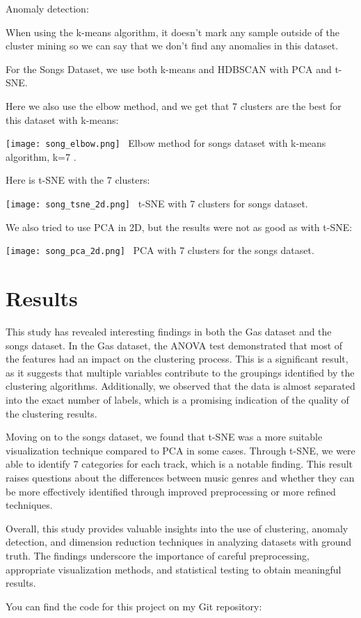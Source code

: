 Anomaly detection:

When using the k-means algorithm, it doesn't mark any sample outside of the cluster mining so we can say that we don't find any anomalies in this dataset.

For the Songs Dataset, we use both k-means and HDBSCAN with PCA and t-SNE.

Here we also use the elbow method, and we get that 7 clusters are the best for this dataset with k-means:

\begin{center}
\texttt{[image: song\_elbow.png]}\
\newline
Elbow method for songs dataset with k-means algorithm, k=7 .
\end{center}

Here is t-SNE with the 7 clusters:

\begin{center}
\texttt{[image: song\_tsne\_2d.png]}\
\newline
t-SNE with 7 clusters for songs dataset.
\end{center}

We also tried to use PCA in 2D, but the results were not as good as with t-SNE:

\begin{center}
\texttt{[image: song\_pca\_2d.png]}\
\newline
PCA with 7 clusters for the songs dataset.
\end{center}
\section{Results}
This study has revealed interesting findings in both the Gas dataset and the songs dataset. In the Gas dataset, the ANOVA test demonstrated that most of the features had an impact on the clustering process. This is a significant result, as it suggests that multiple variables contribute to the groupings identified by the clustering algorithms. Additionally, we observed that the data is almost separated into the exact number of labels, which is a promising indication of the quality of the clustering results.

Moving on to the songs dataset, we found that t-SNE was a more suitable visualization technique compared to PCA in some cases. Through t-SNE, we were able to identify 7 categories for each track, which is a notable finding. This result raises questions about the differences between music genres and whether they can be more effectively identified through improved preprocessing or more refined techniques.

Overall, this study provides valuable insights into the use of clustering, anomaly detection, and dimension reduction techniques in analyzing datasets with ground truth. The findings underscore the importance of careful preprocessing, appropriate visualization methods, and statistical testing to obtain meaningful results.


You can find the code for this project on my Git repository:
\href{https://github.com/shohamyamin/unsupervised}

\nocite{*}



